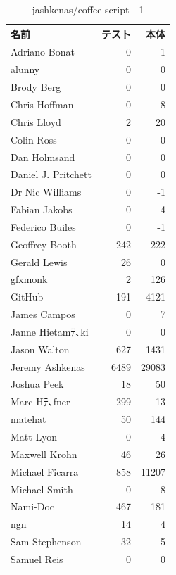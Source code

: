 \begin{table}[htb]
\begin{center}
\caption{jashkenas/coffee-script - 1}
\begin{tabular}{|l|r|r|} \hline 
名前 & テスト & 本体 \\ \hline \hline
Adriano Bonat & 0 & 1\\ \hline
alunny & 0 & 0\\ \hline
Brody Berg & 0 & 0\\ \hline
Chris Hoffman & 0 & 8\\ \hline
Chris Lloyd & 2 & 20\\ \hline
Colin Ross & 0 & 0\\ \hline
Dan Holmsand & 0 & 0\\ \hline
Daniel J. Pritchett & 0 & 0\\ \hline
Dr Nic Williams & 0 & -1\\ \hline
Fabian Jakobs & 0 & 4\\ \hline
Federico Builes & 0 & -1\\ \hline
Geoffrey Booth & 242 & 222\\ \hline
Gerald Lewis & 26 & 0\\ \hline
gfxmonk & 2 & 126\\ \hline
GitHub & 191 & -4121\\ \hline
James Campos & 0 & 7\\ \hline
Janne Hietamﾃ､ki & 0 & 0\\ \hline
Jason Walton & 627 & 1431\\ \hline
Jeremy Ashkenas & 6489 & 29083\\ \hline
Joshua Peek & 18 & 50\\ \hline
Marc Hﾃ､fner & 299 & -13\\ \hline
matehat & 50 & 144\\ \hline
Matt Lyon & 0 & 4\\ \hline
Maxwell Krohn & 46 & 26\\ \hline
Michael Ficarra & 858 & 11207\\ \hline
Michael Smith & 0 & 8\\ \hline
Nami-Doc & 467 & 181\\ \hline
ngn & 14 & 4\\ \hline
Sam Stephenson & 32 & 5\\ \hline
Samuel Reis & 0 & 0\\ \hline
\end{tabular}
\end{center}
\end{table}


